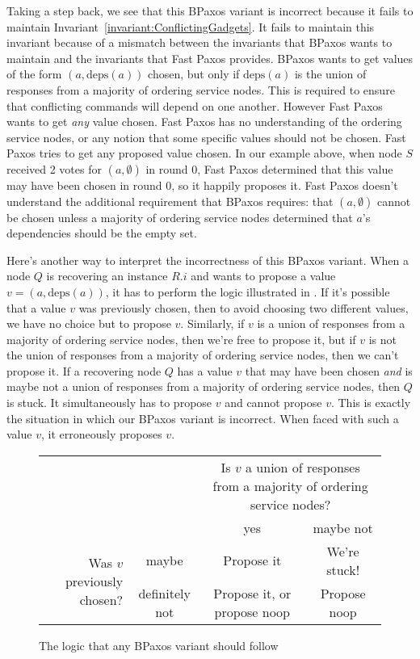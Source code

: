 \documentclass{mwhittaker}
\theoremstyle{definition}
\newcommand{\deps}[1]{\text{deps}(#1)}
\newcommand{\invref}[1]{Invariant~\ref{invariant:#1}}
\begin{document}
Taking a step back, we see that this BPaxos variant is incorrect because it
fails to maintain \invref{ConflictingGadgets}. It fails to maintain this
invariant because of a mismatch between the invariants that BPaxos wants to
maintain and the invariants that Fast Paxos provides. BPaxos wants to get
values of the form $(a, \deps{a})$ chosen, but only if $\deps{a}$ is the union
of responses from a majority of ordering service nodes. This is required to
ensure that conflicting commands will depend on one another. However Fast
Paxos wants to get \emph{any} value chosen. Fast Paxos has no understanding of
the ordering service nodes, or any notion that some specific values should not
be chosen. Fast Paxos tries to get any proposed value chosen. In our example
above, when node $S$ received 2 votes for $(a, \emptyset)$ in round 0, Fast
Paxos determined that this value may have been chosen in round 0, so it happily
proposes it. Fast Paxos doesn't understand the additional requirement that
BPaxos requires: that $(a, \emptyset)$ cannot be chosen unless a majority of
ordering service nodes determined that $a$'s dependencies should be the empty
set.

Here's another way to interpret the incorrectness of this BPaxos variant. When
a node $Q$ is recovering an instance $R.i$ and wants to propose a value $v =
(a, \deps{a})$, it has to perform the logic illustrated in
.
%
If it's possible that a value $v$ was previously chosen, then to avoid choosing
two different values, we have no choice but to propose $v$.
%
Similarly, if $v$ is a union of responses from a majority of ordering service
nodes, then we're free to propose it, but if $v$ is not the union of responses
from a majority of ordering service nodes, then we can't propose it.
%
If a recovering node $Q$ has a value $v$ that may have been chosen \emph{and}
is maybe not a union of responses from a majority of ordering service nodes,
then $Q$ is stuck. It simultaneously has to propose $v$ and cannot propose $v$.
This is exactly the situation in which our BPaxos variant is incorrect. When
faced with such a value $v$, it erroneously proposes $v$.

\begin{figure}[h]
  \centering
  \begin{tabular}{rccc}
    &
    &
    \multicolumn{2}{p{3in}}{%
      Is $v$ a union of responses from a majority of ordering service nodes?%
    } \\
    &
    &
    yes &
    maybe not \\\cline{3-4}
    \multirow{2}{1.8in}{Was $v$ previously chosen?} &
    maybe &
    \multicolumn{1}{|c|}{Propose it} &
    \multicolumn{1}{|c|}{We're stuck!} \\\cline{3-4}
    &
    definitely not &
    \multicolumn{1}{|c|}{Propose it, or propose noop} &
    \multicolumn{1}{|c|}{Propose noop} \\\cline{3-4}
  \end{tabular}
  \caption{The logic that any BPaxos variant should follow}%
\end{figure}
\end{document}
